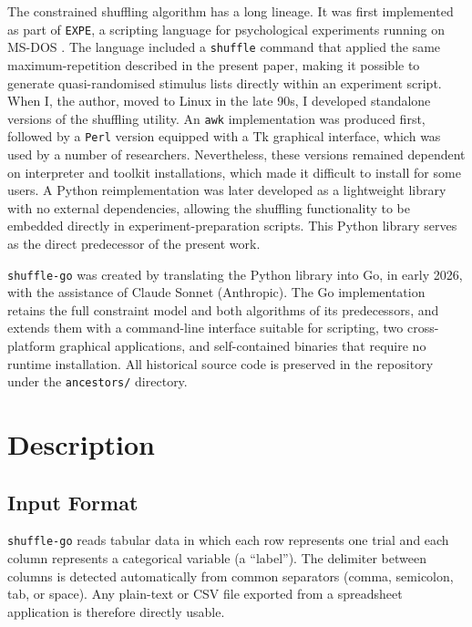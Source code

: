 \documentclass[doc,a4paper,biblatex]{apa7}
\begin{document}
The constrained shuffling algorithm has a long lineage. It was first
implemented as part of \texttt{EXPE}, a scripting language for
psychological experiments running on MS-DOS \parencite{pallier1997}.
The language included a \texttt{shuffle} command that applied the same
maximum-repetition described in the present paper, making it possible
to generate quasi-randomised stimulus lists directly within an
experiment script. When I, the author, moved to Linux in the late 90s,
I developed standalone versions of the shuffling utility. An
\texttt{awk} implementation was produced first, followed by a
\texttt{Perl} version equipped with a Tk graphical interface, which
was used by a number of researchers. Nevertheless, these versions
remained dependent on interpreter and toolkit installations, which
made it difficult to install for some users. A Python reimplementation
was later developed as a lightweight library with no external
dependencies, allowing the shuffling functionality to be embedded
directly in experiment-preparation scripts. This Python library serves
as the direct predecessor of the present work.

\texttt{shuffle-go} was created by translating the Python library into
Go, in early 2026, with the assistance of Claude Sonnet (Anthropic). The Go
implementation retains the full constraint model and both algorithms of
its predecessors, and extends them with a command-line interface suitable
for scripting, two cross-platform graphical applications, and
self-contained binaries that require no runtime installation. All
historical source code is preserved in the repository under the
\texttt{ancestors/} directory.

\section{Description}
\label{sec:description}

\subsection{Input Format}

\texttt{shuffle-go} reads tabular data in which each row represents one
trial and each column represents a categorical variable (a ``label''). The
delimiter between columns is detected automatically from common separators
(comma, semicolon, tab, or space). Any plain-text or CSV file exported
from a spreadsheet application is therefore directly usable.
\end{document}
